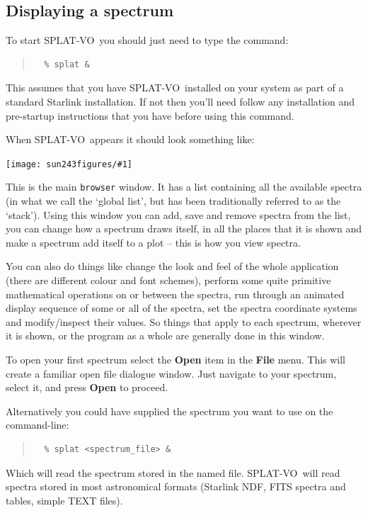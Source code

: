 \documentclass[twoside,11pt]{article}
\newcommand{\htmladdimg}[1]{}
\newcommand{\latexhtml}[2]{#1}
\renewcommand{\_}{\texttt{\symbol{95}}}
\newcommand{\SPLAT}{\textsf{SPLAT-VO}}
\newcommand{\mainfigure}[1]
{\begin{center}
 \latexhtml{\texttt{[image: sun243\_figures/\#1]}}{\htmladdimg{#1.gif}}
 \end{center}
}
\newcommand{\menuitem}[1]{\textbf{#1}}
\newcommand{\hitext}[1]{\texttt{#1}}
\begin{document}
\newpage
\subsection{Displaying a spectrum}

To start \SPLAT\ you should just need to type the command:
\begin{quote}
\begin{verbatim}
  % splat &
\end{verbatim}
\end{quote}
This assumes that you have \SPLAT\ installed on your system as part of a
standard Starlink installation. If not then you'll need follow any
installation and pre-startup instructions that you have before using
this command.

When \SPLAT\ appears it should look something like:

\mainfigure{browser1}

This is the main \hitext{browser} window. It has a list containing all
the available spectra (in what we call the `global list', but has been
traditionally referred to as the `stack'). Using this window you can
add, save and remove spectra from the list, you can change how a
spectrum draws itself, in all the places that it is shown and make a
spectrum add itself to a plot -- this is how you view spectra.

You can also do things like change the look and feel of the whole
application (there are different colour and font schemes), perform
some quite primitive mathematical operations on or between the
spectra, run through an animated display sequence of some or all of the
spectra, set the spectra coordinate systems and modify/inspect their
values. So things that apply to each spectrum, wherever it is shown,
or the program as a whole are generally done in this window.

To open your first spectrum select the \menuitem{Open} item in the
\menuitem{File} menu. This will create a familiar open file dialogue
window. Just navigate to your spectrum, select it, and press
\menuitem{Open} to proceed.

Alternatively you could have supplied the spectrum you want to use on
the command-line:
\begin{quote}
\begin{verbatim}
  % splat <spectrum_file> &
\end{verbatim}
\end{quote}
Which will read the spectrum stored in the named file. \SPLAT\ will read
spectra stored in most astronomical formats (Starlink NDF, FITS spectra and
tables, simple TEXT files).
\end{document}

